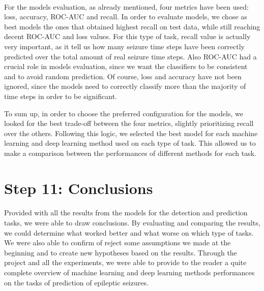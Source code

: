 \paragraph{} For the models evaluation, as already mentioned, four metrics have been used: loss, accuracy, ROC-AUC and recall. In order to evaluate models, we chose as best models the ones that obtained highest recall on test data, while still reaching decent ROC-AUC and loss values. For this type of task, recall value is actually very important, as it tell us how many seizure time steps have been correctly predicted over the total amount of real seizure time steps. Also ROC-AUC had a crucial role in models evaluation, since we want the classifiers to be consistent and to avoid random prediction. Of course, loss and accuracy have not been ignored, since the models need to correctly classify more than the majority of time steps in order to be significant.

To sum up, in order to choose the preferred configuration for the models, we looked for the best trade-off between the four metrics, slightly prioritizing recall over the others. Following this logic, we selected the best model for each machine learning and deep learning method used on each type of task. This allowed us to make a comparison between the performances of different methods for each task.


\section{Step 11: Conclusions} \label{sec: step_conclusions}
\paragraph{} Provided with all the results from the models for the detection and prediction tasks, we were able to draw conclusions. By evaluating and comparing the results, we could determine what worked better and what worse on which type of tasks. We were also able to confirm of reject some assumptions we made at the beginning and to create new hypotheses based on the results. Through the project and all the experiments, we were able to provide to the reader a quite complete overview of machine learning and deep learning methods performances on the tasks of prediction of epileptic seizures.
